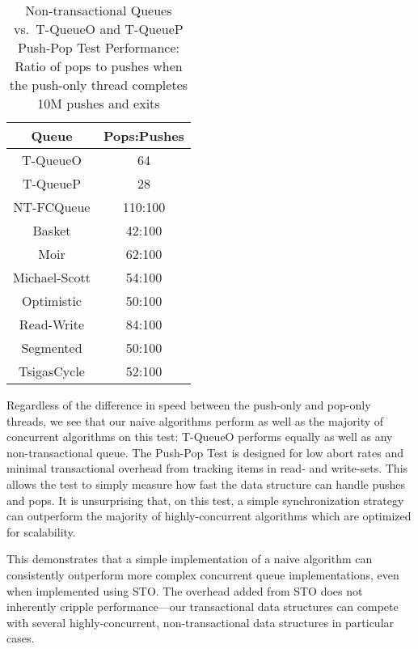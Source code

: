 \begin{table}[t]
        \centering
    \begin{tabular}{|cc|}
        \hline
        Queue & Pops:Pushes\\
        \hline
            T-QueueO & 64\\
            T-QueueP & 28\\
            NT-FCQueue & 110:100\\
            Basket & 42:100\\
            Moir & 62:100\\
            Michael-Scott& 54:100\\
            Optimistic & 50:100\\
            Read-Write & 84:100\\
            Segmented & 50:100\\
            TsigasCycle & 52:100\\
        \hline
    \end{tabular}
    \caption{Non-transactional Queues vs.\ T-QueueO and T-QueueP Push-Pop Test Performance: Ratio of pops to pushes when the push-only thread completes 10M pushes and exits}
    \label{tab:push_pop_ratio}
\end{table}

Regardless of the difference in speed between the push-only and pop-only threads, we see that our naive algorithms perform as well as the majority of concurrent algorithms on this test: T-QueueO performs equally as well as any non-transactional queue. The Push-Pop Test is designed for low abort rates and minimal transactional overhead from tracking items in read- and write-sets. This allows the test to simply measure how fast the data structure can handle pushes and pops. It is unsurprising that, on this test, a simple synchronization strategy can outperform the majority of highly-concurrent algorithms which are optimized for scalability. 

This demonstrates that a simple implementation of a naive algorithm can consistently outperform more complex concurrent queue implementations, even when implemented using STO. The overhead added from STO does not inherently cripple performance---our transactional data structures can compete with several highly-concurrent, non-transactional data structures in particular cases. 

\vspace{12pt}
\noindent{}


